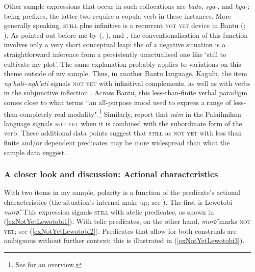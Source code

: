 Other sample expressions that occur in such collocations are  \textit{bado},  \mbox{\textit{sya}-}, and  \mbox{\textit{kya}-}; being prefixes, the latter two require a copula verb in these instances. More generally speaking, \textsc{still} plus infinitive is a recurrent \textsc{not yet} device in Bantu (\cite[148]{Nurse2008}; \cite{VeselinovaDevos2021}). As pointed out before me by \citeauthor{Gueldemann1996} (\citeyear{Gueldemann1996}, \citeyear[129–130]{Gueldemann1998}), \textcite[148]{Nurse2008} and \textcite{VeselinovaDevos2021}, the conventionalisation of this function involves only a very short conceptual leap: the  of a negative situation is a straightforward inference from a persistently unactualised one like \lq still to cultivate my plot\rq{}. The same explanation probably applies to variations on this theme outside of my sample. Thus, in another Bantu language, Kagulu, the item \textit{ng'hali}\sim\textit{ngh'ati} signals \textsc{not yet} with infinitival complements, as well as with verbs in the subjunctive  inflection \parencite[146]{Petzell2008}. Across Bantu, this less-than-finite verbal paradigm comes close to what \textcite[326]{Timberlake2007} terms \lq\lq an all-purpose mood used to express a range of less-than-completely real modality".\footnote{See \textcite[83–84]{RoseEtAl2002} for an overview.} Similarly, \textcite{deAnguloFreeland1930} report that \textit{nám} in the Palaihnihan language  signals \textsc{not yet} when it is combined with the subordinate form of the verb. These additional data points suggest that \textsc{still} as \textsc{not yet} with less than finite and/or dependent predicates may be more widespread than what the sample data suggest.

\subsubsection{A closer look and discussion: Actional characteristics} 
With two items in my sample, polarity is a function of the predicate's actional characteristics (the situation's internal make up; see ). The first is Lewotobi \textit{morә̃}. This expression signals \textsc{still} with atelic predicates, as shown in (\ref{exNotYetLewotobi1}). With telic predicates, on the other hand, \textit{morә̃} marks \textsc{not yet}; see (\ref{exNotYetLewotobi2}). Predicates that allow for both construals are ambiguous without further context; this is illustrated in (\ref{exNotYetLewotobi3}).

